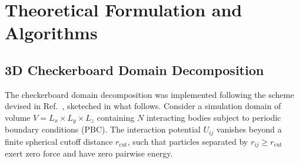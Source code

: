 \documentclass[final,5p,times,twocolumn]{elsarticle}
\begin{document}
\section{Theoretical Formulation and Algorithms}
\label{sec:algorithms}

\subsection{3D Checkerboard Domain Decomposition}
\label{sec:algo_cb}

 The checkerboard domain decomposition was implemented  following the
 scheme devised in Ref.~\cite{anderson2013checkerboard}, sketeched in
 what follows. 
Consider a simulation domain of volume $V = L_x \times L_y \times L_z$
containing $N$ interacting bodies subject to periodic boundary
conditions (PBC). The interaction potential $U_{ij}$ vanishes beyond a
finite spherical cutoff distance $r_{\text{cut}}$, such that particles
separated by $r_{ij} \ge r_{\text{cut}}$ exert zero force and have
zero pairwise energy. 
\end{document}
